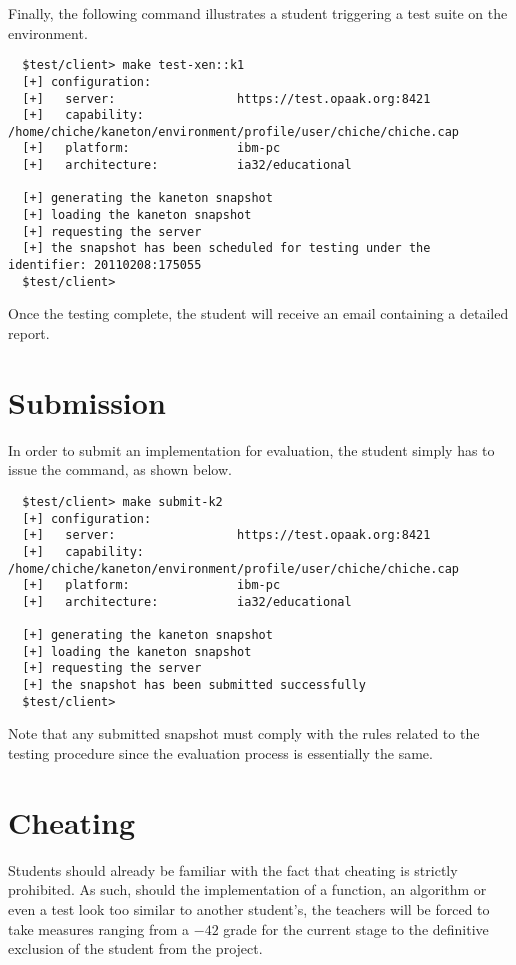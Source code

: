 Finally, the following command illustrates a student triggering a test
suite on the  environment.

\begin{verbatim}
  $test/client> make test-xen::k1
  [+] configuration:
  [+]   server:                 https://test.opaak.org:8421
  [+]   capability:             /home/chiche/kaneton/environment/profile/user/chiche/chiche.cap
  [+]   platform:               ibm-pc
  [+]   architecture:           ia32/educational

  [+] generating the kaneton snapshot
  [+] loading the kaneton snapshot
  [+] requesting the server
  [+] the snapshot has been scheduled for testing under the identifier: 20110208:175055
  $test/client>
\end{verbatim}

Once the testing complete, the student will receive an email containing
a detailed report.

%
%

\section{Submission}

In order to submit an implementation for evaluation, the student simply
has to issue the  command, as shown below.

\begin{verbatim}
  $test/client> make submit-k2
  [+] configuration:
  [+]   server:                 https://test.opaak.org:8421
  [+]   capability:             /home/chiche/kaneton/environment/profile/user/chiche/chiche.cap
  [+]   platform:               ibm-pc
  [+]   architecture:           ia32/educational

  [+] generating the kaneton snapshot
  [+] loading the kaneton snapshot
  [+] requesting the server
  [+] the snapshot has been submitted successfully
  $test/client>
\end{verbatim}

Note that any submitted snapshot must comply with the rules related to the
testing procedure since the evaluation process is essentially the same.

%
%

\section{Cheating}

Students should already be familiar with the fact that cheating is
strictly prohibited. As such, should the implementation of a function,
an algorithm or even a test look too similar to another student's, the
teachers will be forced to take measures ranging from a $-42$ grade for
the current stage to the definitive exclusion of the student from the
project.
